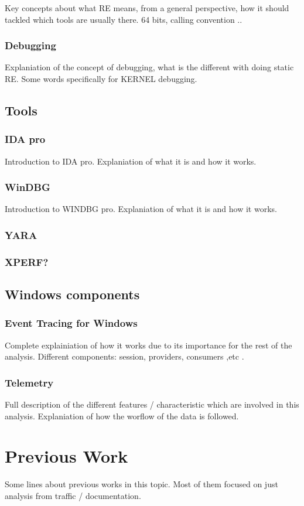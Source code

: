 \documentclass[11pt,a4paper,twoside]{tesis}
\begin{document}
Key concepts about what RE means, from a general perspective, how it should tackled which tools are usually there.  64 bits, calling convention .. 
\subsubsection*{Debugging}
Explaniation of the concept of debugging, what is the different with doing static RE. Some words specifically for KERNEL debugging. 
\subsection*{Tools}
\subsubsection*{IDA pro}
Introduction to IDA pro. Explaniation of what it is and how it works.
\subsubsection*{WinDBG}
Introduction to WINDBG pro. Explaniation of what it is and how it works.
\subsubsection*{YARA}
\subsubsection*{XPERF? }

\subsection*{Windows components}
\subsubsection*{Event Tracing for Windows}
Complete explainiation of how it works due to its importance for the rest of the analysis. Different components: session, providers, consumers ,etc .
\subsubsection*{Telemetry}
Full description of the different features / characteristic which are involved in this analysis. Explaniation of how the worflow of the data is followed.


\section*{Previous Work}
Some lines about previous works in this topic. Most of them focused on just analysis from traffic / documentation. 
\end{document}
